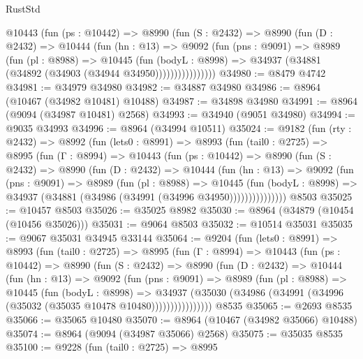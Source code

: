 \begin{lexlean}{RustStd}
\begin{coremodule}
            @10443
              (fun (ps : @10442) =>
              @8990
                (fun (S : @2432) =>
                @8990
                  (fun (D : @2432) =>
                  @10444
                    (fun (hn : @13) =>
                    @9092
                      (fun (pns : @9091) =>
                      @8989
                        (fun (pl : @8988) =>
                        @10445
                          (fun (bodyL : @8998) =>
                          @34937 (@34881 (@34892 (@34903 (@34944 @34950))))))))))))))))
@34980 := @8479 @4742
@34981 := @34979 @34980
@34982 := @34887 @34980
@34986 := @8964 (@10467 (@34982 @10481) @10488)
@34987 := @34898 @34980
@34991 := @8964 (@9094 (@34987 @10481) @2568)
@34993 := @34940 (@9051 @34980)
@34994 := @9035 @34993
@34996 := @8964 (@34994 @10511)
@35024 := @9182
    (fun (rty : @2432) =>
    @8992
      (fun (lets0 : @8991) =>
      @8993
        (fun (tail0 : @2725) =>
        @8995
          (fun (Γ : @8994) =>
          @10443
            (fun (ps : @10442) =>
            @8990
              (fun (S : @2432) =>
              @8990
                (fun (D : @2432) =>
                @10444
                  (fun (hn : @13) =>
                  @9092
                    (fun (pns : @9091) =>
                    @8989
                      (fun (pl : @8988) =>
                      @10445
                        (fun (bodyL : @8998) =>
                        @34937 (@34881 (@34986 (@34991 (@34996 @34950)))))))))))))))
    @8503
@35025 := @10457 @8503
@35026 := @35025 @8982
@35030 := @8964 (@34879 (@10454 (@10456 @35026)))
@35031 := @9064 @8503
@35032 := @10514 @35031
@35035 := @9067 @35031 @34945 @33144
@35064 := @9204
    (fun (lets0 : @8991) =>
    @8993
      (fun (tail0 : @2725) =>
      @8995
        (fun (Γ : @8994) =>
        @10443
          (fun (ps : @10442) =>
          @8990
            (fun (S : @2432) =>
            @8990
              (fun (D : @2432) =>
              @10444
                (fun (hn : @13) =>
                @9092
                  (fun (pns : @9091) =>
                  @8989
                    (fun (pl : @8988) =>
                    @10445
                      (fun (bodyL : @8998) =>
                      @34937
                        (@35030
                          (@34986 (@34991 (@34996 (@35032 (@35035 @10478 @10480))))))))))))))))
    @8535
@35065 := @2693 @8535
@35066 := @35065 @10480
@35070 := @8964 (@10467 (@34982 @35066) @10488)
@35074 := @8964 (@9094 (@34987 @35066) @2568)
@35075 := @35035 @8535
@35100 := @9228
    (fun (tail0 : @2725) =>
    @8995

\end{coremodule}
\end{lexlean}
